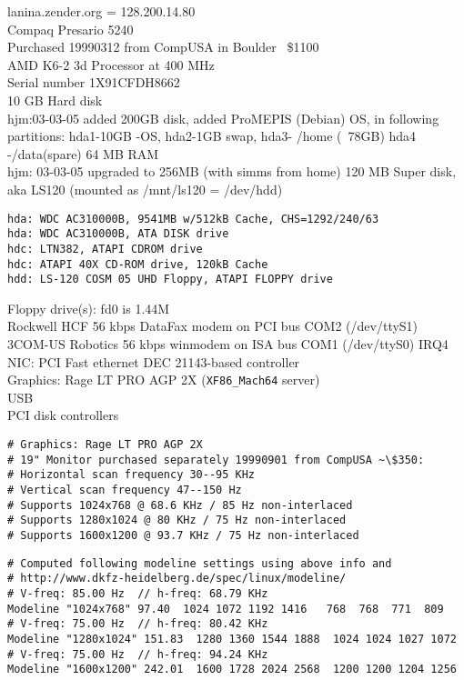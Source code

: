 \documentclass[12pt,twoside]{article}
\begin{document}
lanina.zender.org = 128.200.14.80\\
Compaq Presario 5240\\
Purchased 19990312 from CompUSA in Boulder ~\$1100\\
AMD K6-2 3d Processor at 400 MHz\\
Serial number 1X91CFDH8662\\
10 GB Hard disk\\
hjm:03-03-05 added 200GB disk, added ProMEPIS (Debian) OS, in following partitions:
hda1-10GB -OS, hda2-1GB swap, hda3- /home (~78GB) hda4 -/data(spare)
64 MB RAM\\
hjm: 03-03-05 upgraded to 256MB (with simms from home)
120 MB Super disk, aka LS120 (mounted as /mnt/ls120 = /dev/hdd)\\
\begin{verbatim}
hda: WDC AC310000B, 9541MB w/512kB Cache, CHS=1292/240/63
hda: WDC AC310000B, ATA DISK drive
hdc: LTN382, ATAPI CDROM drive
hdc: ATAPI 40X CD-ROM drive, 120kB Cache
hdd: LS-120 COSM 05 UHD Floppy, ATAPI FLOPPY drive
\end{verbatim}
Floppy drive(s): fd0 is 1.44M\\
Rockwell HCF 56 kbps DataFax modem on PCI bus COM2 (/dev/ttyS1)\\
3COM-US Robotics 56 kbps winmodem on ISA bus COM1 (/dev/ttyS0) IRQ4 \\
NIC: PCI Fast ethernet DEC 21143-based controller\\
Graphics: Rage LT PRO AGP 2X (\verb'XF86_Mach64' server)\\
USB\\
PCI disk controllers\\
\begin{verbatim}
# Graphics: Rage LT PRO AGP 2X
# 19" Monitor purchased separately 19990901 from CompUSA ~\$350:
# Horizontal scan frequency 30--95 KHz
# Vertical scan frequency 47--150 Hz
# Supports 1024x768 @ 68.6 KHz / 85 Hz non-interlaced
# Supports 1280x1024 @ 80 KHz / 75 Hz non-interlaced
# Supports 1600x1200 @ 93.7 KHz / 75 Hz non-interlaced
\end{verbatim}
\begin{verbatim}
# Computed following modeline settings using above info and
# http://www.dkfz-heidelberg.de/spec/linux/modeline/
# V-freq: 85.00 Hz  // h-freq: 68.79 KHz
Modeline "1024x768" 97.40  1024 1072 1192 1416   768  768  771  809 
# V-freq: 75.00 Hz  // h-freq: 80.42 KHz
Modeline "1280x1024" 151.83  1280 1360 1544 1888  1024 1024 1027 1072 
# V-freq: 75.00 Hz  // h-freq: 94.24 KHz
Modeline "1600x1200" 242.01  1600 1728 2024 2568  1200 1200 1204 1256 
\end{verbatim}
\end{document}
